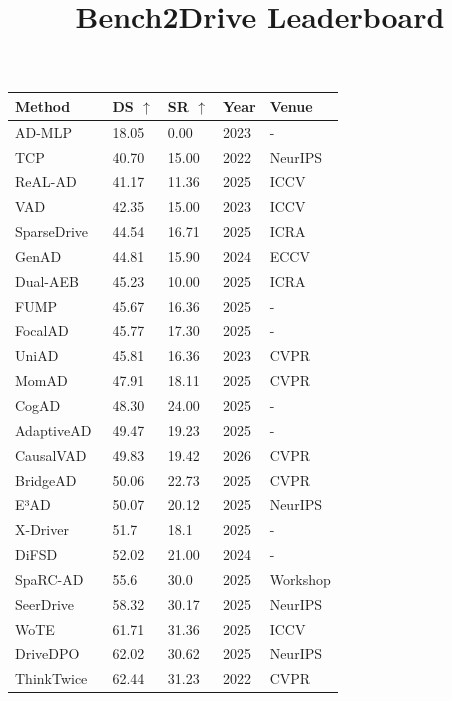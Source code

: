 \documentclass[10pt,twocolumn,letterpaper]{article}
\title{Bench2Drive Leaderboard}
\begin{document}
\begin{table}[t]
\setlength{\tabcolsep}{4pt}
\small
\centering
\begin{tabular}{l|ll|ll}
\toprule
\textbf{Method} & \textbf{DS} $\uparrow$ & \textbf{SR} $\uparrow$ & \textbf{Year} & \textbf{Venue} \\
\midrule
AD-MLP~\cite{Zhai2023ARXIV} & 18.05 & 0.00 & 2023 & - \\
TCP~\cite{Wu2022NeurIPS} & 40.70 & 15.00 & 2022 & NeurIPS \\
ReAL-AD~\cite{Lu2025ICCV} & 41.17 & 11.36 & 2025 & ICCV \\
VAD~\cite{Jiang2023ICCV} & 42.35 & 15.00 & 2023 & ICCV \\
SparseDrive~\cite{Sun2025ICRA} & 44.54 & 16.71 & 2025 & ICRA \\
GenAD~\cite{Zheng2024ECCV} & 44.81 & 15.90 & 2024 & ECCV \\
Dual-AEB~\cite{Zhang2025ICRA} & 45.23 & 10.00 & 2025 & ICRA \\
FUMP~\cite{Liu2025ARXIVc} & 45.67 & 16.36 & 2025 & - \\
FocalAD~\cite{Sun2025ARXIV} & 45.77 & 17.30 & 2025 & - \\
UniAD~\cite{Hu2023CVPR} & 45.81 & 16.36 & 2023 & CVPR \\
MomAD~\cite{Song2025CVPR} & 47.91 & 18.11 & 2025 & CVPR \\
CogAD~\cite{Wang2025ARXIV} & 48.30 & 24.00 & 2025 & - \\
AdaptiveAD~\cite{Tang2025ARXIV} & 49.47 & 19.23 & 2025 & - \\
CausalVAD~\cite{Tang2026CVPR} & 49.83 & 19.42 & 2026 & CVPR \\
BridgeAD~\cite{Zhang2025CVPR} & 50.06 & 22.73 & 2025 & CVPR \\
E³AD~\cite{Niu2025NEURIPS} & 50.07 & 20.12 & 2025 & NeurIPS \\
X-Driver~\cite{Liu2025ARXIVb} & 51.7 & 18.1 & 2025 & - \\
DiFSD~\cite{Su2024ARXIV} & 52.02 & 21.00 & 2024 & - \\
SpaRC-AD~\cite{Wolters2025ICCVWORK} & 55.6 & 30.0 & 2025 & Workshop \\
SeerDrive~\cite{Zhang2025NEURIPS} & 58.32 & 30.17 & 2025 & NeurIPS \\
WoTE~\cite{Li2025ICCV} & 61.71 & 31.36 & 2025 & ICCV \\
DriveDPO~\cite{Shang2025NEURIPS} & 62.02 & 30.62 & 2025 & NeurIPS \\
ThinkTwice~\cite{Jia2023CVPR} & 62.44 & 31.23 & 2022 & CVPR \\

\end{tabular}
\end{table}
\end{document}
